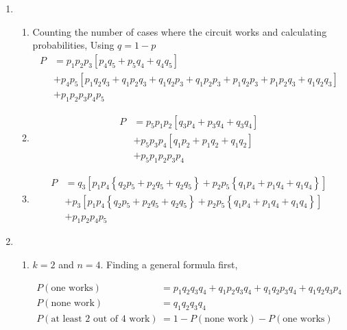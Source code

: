 \begin{enumerate}
	\item \begin{enumerate}
		\item Counting the number of cases where the circuit works and calculating probabilities, Using $ q = 1-p $
		\begin{subequations}
			\begin{align}
				P &= p_1 p_2 p_3 \left[ p_4 q_5 + p_5 q_4 + q_4 q_5 \right] \nonumber \\
				&+ p_4 p_5 \left[ p_1 q_2 q_3 + q_1 p_2 q_3 + q_1 q_2 p_3 + q_1 p_2 p_3 + p_1 q_2 p_3 + p_1 p_2 q_3 + q_1 q_2 q_3 \right]	\nonumber \\
				&+ p_1 p_2 p_3 p_4 p_5
			\end{align}
		\end{subequations}
		
		\item \begin{subequations}
			\begin{align}
				P &= p_5 p_1 p_2 \left[ q_3 p_4 + p_3 q_4 + q_3 q_4 \right] \nonumber \\
				&+ p_5 p_3 p_4 \left[ q_1 p_2 + p_1 q_2 + q_1 q_2 \nonumber \right] \\
				&+ p_5 p_1 p_2 p_3 p_4
			\end{align}
		\end{subequations}
		
		\item \begin{subequations}
			\begin{align}
				P &= q_3 \left[ p_1 p_4 \left\{ q_2 p_5 + p_2 q_5 + q_2 q_5 \right\} + p_2 p_5 \left\{ q_1 p_4 + p_1 q_4 + q_1 q_4 \right\} \right] \nonumber \\
				&+ p_3 \left[ p_1 p_4 \left\{ q_2 p_5 + p_2 q_5 + q_2 q_5 \right\} + p_2 p_5 \left\{ q_1 p_4 + p_1 q_4 + q_1 q_4 \right\} \right] \nonumber \\
				&+ p_1 p_2 p_4 p_5 
			\end{align}
		\end{subequations}
	\end{enumerate}
	
	\item \begin{enumerate}
		\item $ k = 2 $ and $ n = 4 $. Finding a general formula first, 
		
		\begin{subequations}
			\begin{align}
				P(\text{one works}) &= p_1 q_2 q_3 q_4 + q_1 p_2 q_3 q_4 + q_1 q_2 p_3 q_4 + q_1 q_2 q_3 p_4 \\
				P(\text{none work}) &= q_1 q_2 q_3 q_4 \\
				P(\text{at least 2 out of 4 work}) &= 1 - P(\text{none work}) - P(\text{one works})
			\end{align}
		\end{subequations}
		

\end{enumerate}
\end{enumerate}
